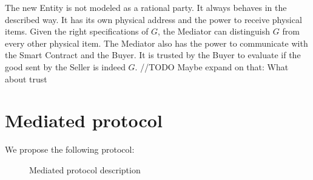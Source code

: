 \documentclass{cacthesis}
\begin{document}
The new Entity is not modeled as a rational party. It always behaves in the described way. It has its own physical address and the power to receive physical items. Given the right specifications of $G$, the Mediator can distinguish $G$ from every other  physical item. The Mediator also has the power to communicate with the Smart Contract and the Buyer. It is trusted by the Buyer to evaluate if the good sent by the Seller is indeed $G$.
//TODO Maybe expand on that: What about trust
\section{Mediated protocol}
\label{sec:mediated-protocol}
We propose the following protocol:
\begin{figure}[htb!]
    \centering
    \caption{Mediated protocol description}
    \label{pro:mediated-protocol}
\end{figure}
\end{document}
